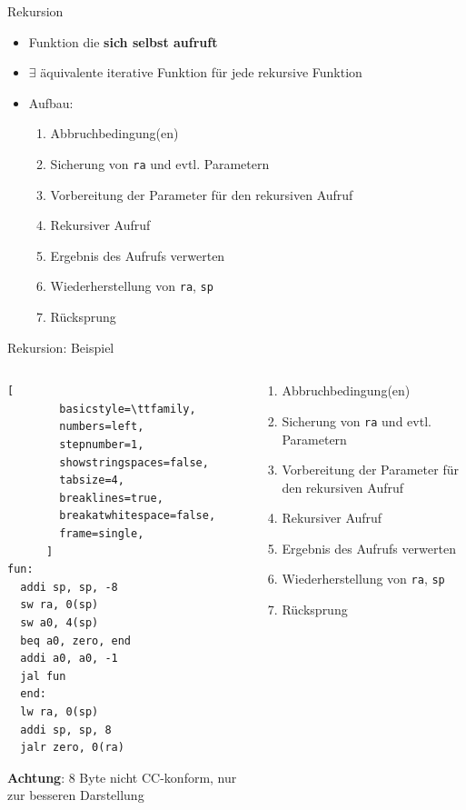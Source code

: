 \documentclass[
  german,            %
  aspectratio=169,    %
]{tumbeamer}
\begin{document}
\begin{frame}[c, fragile]{Rekursion}{}
  \begin{itemize}
    \item Funktion die \textbf{sich selbst aufruft}
    \item $\exists$ äquivalente iterative Funktion für jede rekursive Funktion
    \item Aufbau:
          \begin{enumerate}
            \item Abbruchbedingung(en)
            \item Sicherung von \verb|ra| und evtl. Parametern
            \item Vorbereitung der Parameter für den rekursiven Aufruf
            \item Rekursiver Aufruf
            \item Ergebnis des Aufrufs verwerten
            \item Wiederherstellung von \verb|ra|, \verb|sp|
            \item Rücksprung
          \end{enumerate}
  \end{itemize}
\end{frame}

\begin{frame}[c, fragile]{Rekursion: Beispiel}{}
  \begin{columns}[c]
    \begin{column}{0.4\linewidth}
      \begin{lstlisting}[
        basicstyle=\ttfamily,
        numbers=left,
        stepnumber=1,
        showstringspaces=false,
        tabsize=4,
        breaklines=true,
        breakatwhitespace=false,
        frame=single,
      ]
fun:
  addi sp, sp, -8
  sw ra, 0(sp)
  sw a0, 4(sp)
  beq a0, zero, end
  addi a0, a0, -1
  jal fun
  end:
  lw ra, 0(sp)
  addi sp, sp, 8
  jalr zero, 0(ra)
      \end{lstlisting}
      \small \textbf{Achtung}: 8 Byte nicht CC-konform, nur zur besseren Darstellung
    \end{column}
    \begin{column}{0.5\linewidth}
      \begin{enumerate}
        \item Abbruchbedingung(en)
        \item Sicherung von \verb|ra| und evtl. Parametern
        \item Vorbereitung der Parameter für den rekursiven Aufruf
        \item Rekursiver Aufruf
        \item Ergebnis des Aufrufs verwerten
        \item Wiederherstellung von \verb|ra|, \verb|sp|
        \item Rücksprung
      \end{enumerate}
      \vspace{1cm}
    \end{column}
  \end{columns}
\end{frame}
\end{document}
